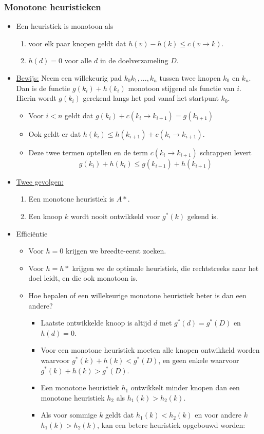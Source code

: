\subsubsection{Monotone heuristieken}
\begin{itemize}
	\item Een heuristiek is monotoon als 
	\begin{enumerate}
		\item voor elk paar knopen geldt dat $h(v) - h(k) \leq c(v \rightarrow k)$.
		\item $h(d) = 0$ voor alle $d$ in de doelverzameling $D$.
	\end{enumerate}
	\item \underline{Bewijs:} Neem een willekeurig pad $k_0k_1, ...,k_n$ tussen twee knopen $k_0$ en $k_n$. Dan is de functie $g(k_i) + h(k_i)$ monotoon stijgend als functie van $i$. Hierin wordt $g(k_i)$ gerekend langs het pad vanaf het startpunt $k_0$.
	\begin{itemize}
		\item Voor $i < n$ geldt dat $g(k_i) + c(k_i \rightarrow k_{i + 1}) = g(k_{i + 1})$
		\item Ook geldt er dat $h(k_i) \leq h(k_{i + 1}) + c(k_i \rightarrow k_{i + 1})$.
		\item Deze twee termen optellen en de term $c(k_i \rightarrow k_{i + 1})$ schrappen levert 
		$$g(k_i) + h(k_i) \leq g(k_{i + 1}) + h(k_{i + 1})$$
	\end{itemize}
	\item \underline{Twee gevolgen:}
	\begin{enumerate}
		\item Een monotone heuristiek is $A*$.
		\item Een knoop $k$ wordt nooit ontwikkeld voor $g^*(k)$ gekend is.
	\end{enumerate}
	\item Efficiëntie
	\begin{itemize}
		\item Voor $h = 0$ krijgen we breedte-eerst zoeken.
		\item Voor $h = h*$ krijgen we de optimale heuristiek, die rechtstreeks naar het doel leidt, en die ook monotoon is.
		\item Hoe bepalen of een willekeurige monotone heuristiek beter is dan een andere?
		\begin{itemize}
			\item Laatste ontwikkelde knoop is altijd $d$ met $g^*(d) = g^*(D)$ en $h(d) = 0$.
			\item Voor een monotone heuristiek moeten alle knopen ontwikkeld worden waarvoor $g^*(k) + h(k) < g^*(D)$, en geen enkele waarvoor $g^*(k) + h(k) > g^*(D)$.
			\item Een monotone heuristiek $h_1$ ontwikkelt minder knopen dan een monotone heuristiek $h_2$ als $h_1(k) > h_2(k)$. 
			\item Als voor sommige $k$ geldt dat $h_1(k) < h_2(k)$ en voor andere $k$ $h_1(k) > h_2(k)$, kan een betere heuristiek opgebouwd worden:
			

\end{itemize}
\end{itemize}
\end{itemize}

